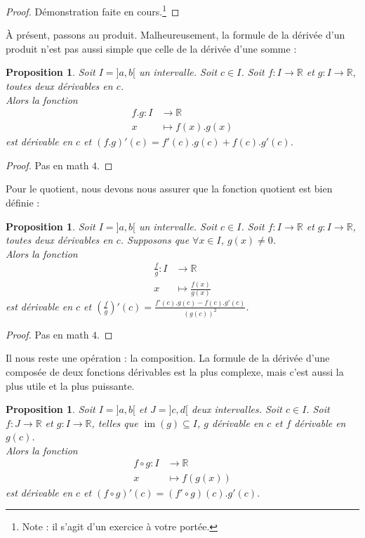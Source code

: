 \documentclass[a4paper,fontsize=13pt]{scrreprt}
\theoremstyle{plain}
\newtheorem{pro}[subsection]{Proposition}
\theoremstyle{definition}
\newcommand{\rr}{\mathbb{R}}
\DeclareMathOperator{\im}{im}
\begin{document}
\begin{proof}
	Démonstration faite en cours.\footnote{Note : il s'agit d'un exercice à votre portée.}
\end{proof}
À présent, passons au produit. Malheureusement, la formule de la dérivée d'un produit n'est pas aussi simple que celle de la dérivée d'une somme :
\begin{pro} \label{derprod}
	Soit $I = ]a,b[$ un intervalle. Soit $c \in I$. Soit $f : I \to \rr$ et $g : I \to \rr$, toutes deux dérivables en $c$. \\
	Alors la fonction
	\begin{align*}
	f.g : I &\to \rr \\
	x &\mapsto f(x).g(x)
	\end{align*}
	est dérivable en $c$ et $(f.g)'(c)=f'(c).g(c)+f(c).g'(c)$.
\end{pro}
\begin{proof}
	Pas en math $4$.
\end{proof}
Pour le quotient, nous devons nous assurer que la fonction quotient est bien définie :
\begin{pro} \label{derquot}
	Soit $I = ]a,b[$ un intervalle. Soit $c \in I$. Soit $f : I \to \rr$ et $g : I \to \rr$, toutes deux dérivables en $c$. Supposons que $\forall x \in I$, $g(x) \neq 0$. \\
	Alors la fonction
	\begin{align*}
	\frac{f}{g} : I &\to \rr \\
	x &\mapsto \frac{f(x)}{g(x)}
	\end{align*}
	est dérivable en $c$ et $\left(\frac{f}{g}\right)'(c)=\frac{f'(c).g(c)-f(c).g'(c)}{(g(c))^2}$.
\end{pro}
\begin{proof}
	Pas en math $4$.
\end{proof}
Il nous reste une opération : la composition. La formule de la dérivée d'une composée de deux fonctions dérivables est la plus complexe, mais c'est aussi la plus utile et la plus puissante.
\begin{pro} \label{dercomp}
	Soit $I = ]a,b[$ et $J=]c,d[$ deux intervalles. Soit $c \in I$. Soit $f : J \to \rr$ et $g : I \to \rr$, telles que $\im (g) \subseteq I$, $g$ dérivable en $c$ et $f$ dérivable en $g(c)$. \\
	Alors la fonction
	\begin{align*}
	f \circ g : I &\to \rr \\
	x &\mapsto f(g(x))
	\end{align*}
	est dérivable en $c$ et $(f \circ g)'(c)=(f' \circ g) (c).g'(c)$.
\end{pro}
\end{document}
